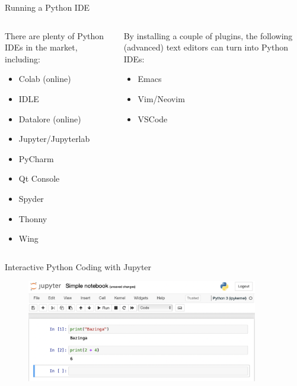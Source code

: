 \documentclass[aspectratio=1610]{beamer}
\begin{document}
\begin{frame}[t]{Running a Python IDE}

	\begin{columns}[t]
	
	\begin{column}{0.45\textwidth}

	There are plenty of Python IDEs in the market, including:
	
	\begin{itemize}
		\item Colab (online)
		\item IDLE
		\item Datalore (online)
		\item Jupyter/Jupyterlab
		\item PyCharm
		\item Qt Console
		\item Spyder
		\item Thonny
		\item Wing
	\end{itemize}
	
	\end{column}
	
	\begin{column}{0.45\textwidth}
	
	By installing a couple of plugins, the following (advanced) text editors can turn into Python IDEs:
	
	\begin{itemize}
		\item Emacs
		\item Vim/Neovim
		\item VSCode
	\end{itemize}
	
	\end{column}
	
	\end{columns}
\end{frame}

\begin{frame}{Interactive Python Coding with Jupyter}
		\begin{figure}
			\includegraphics[width=0.9\textwidth]{images/jupyter}
		\end{figure}
\end{frame}
\end{document}
